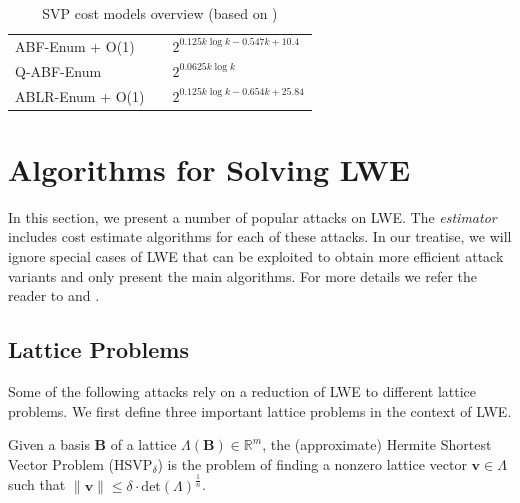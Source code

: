 \begin{table}
\begin{tabular}{lll}
    ABF-Enum + O(1)                  & \cite{ABFKSW20}                 & $2^{0.125k \log k - 0.547k + 10.4}$   \\
    Q-ABF-Enum                       & \cite{ABFKSW20}                 & $2^{0.0625 k \log k}$                 \\
    ABLR-Enum + O(1)                 & \cite{ABLR21}                   & $2^{0.125k \log k - 0.654k + 25.84}$  \\
    \bottomrule
  \end{tabular}
  \caption{SVP cost models overview (based on \cite[Table~4]{ACDDPPVW18})} %
  \label{tab:costmodels}
\end{table} %










\section{Algorithms for Solving LWE}
In this section, we present a number of popular attacks on LWE. The \textit{estimator} includes cost estimate algorithms for each of these attacks. In our treatise, we will ignore special cases of LWE that can be exploited to obtain more efficient attack variants and only present the main algorithms. For more details we refer the reader to \cite{APS15} and \cite{BBGS19}.

\subsection{Lattice Problems}
Some of the following attacks rely on a reduction of LWE to different lattice problems. We first define three important lattice problems in the context of LWE.

\begin{definition} \label{def:hsvp}
  Given a basis $\mathbf{B}$ of a lattice $\Lambda(\mathbf{B}) \in \mathbb{R}^m$, the (approximate)  Hermite Shortest Vector Problem (HSVP$_\delta$) is the problem of finding a nonzero lattice vector $\mathbf{v} \in \Lambda$ such that $\| \mathbf{v} \| \leq \delta \cdot \text{det}(\Lambda)^{\frac{1}{n}}$.
\end{definition}

